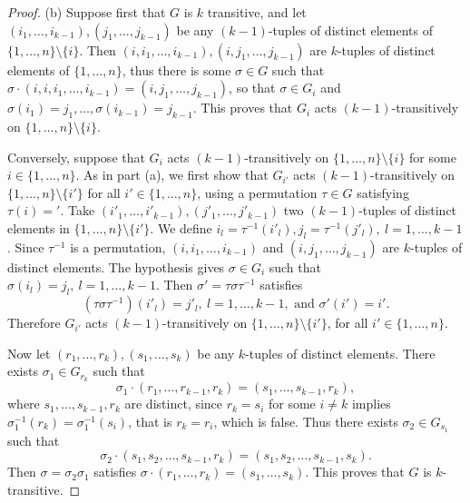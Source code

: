 \documentclass[11pt,a4paper]{article}
\begin{document}
\begin{proof}
\item[(b)] Suppose first that $G$ is $k$ transitive, and let $(i_1,\ldots,i_{k-1}), (j_1,\ldots,j_{k-1})$ be any ${(k-1)}$-tuples of distinct elements of $\{1,\ldots,n\}\setminus \{i\}$. Then $(i, i_1,\ldots,i_{k-1}), (i, j_1,\ldots,j_{k-1})$ are $k$-tuples of distinct elements of $\{1,\ldots,n\}$, thus there is some $\sigma \in G$ such that $\sigma\cdot(i,i, i_1,\ldots,i_{k-1}) = (i, j_1,\ldots,j_{k-1})$, so that $\sigma \in G_i$ and $\sigma(i_1) = j_1,\ldots,\sigma(i_{k-1}) = j_{k-1}$. This proves that $G_i$ acts $(k-1)$-transitively on $\{1,\ldots,n\} \setminus \{i\}$.

Conversely, suppose that $G_i$ acts $(k-1)$-transitively on $\{1,\ldots,n\} \setminus \{i\}$ for some $i \in \{1,\ldots,n\}$. As in part (a), we first show that $G_{i'}$ acts $(k-1)$-transitively on $\{1,\ldots,n\} \setminus \{i'\}$ for all $i' \in \{1,\ldots,n\}$, using a permutation $\tau \in G$ satisfying $\tau(i) = '$. Take $(i'_1,\ldots,i'_{k-1}), (j'_1,\ldots,j'_{k-1})$ two $(k-1)$-tuples of distinct elements in $\{1,\ldots,n\} \setminus \{i'\}$. We define $i_l= \tau^{-1}(i'_l), j_l = \tau^{-1}(j'_l),\ l=1,\ldots,k-1$. Since $\tau^{-1}$ is a permutation, $(i,i_1,\ldots,i_{k-1})$ and $(i,j_1,\ldots,j_{k-1})$ are $k$-tuples of distinct elements. The hypothesis gives $\sigma \in G_i$ such that $\sigma(i_l) = j_l,\ l=1,\ldots,k-1$. Then $\sigma'= \tau \sigma \tau^{-1}$ satisfies
$$(\tau \sigma \tau^{-1})(i'_l) = j'_l,\ l=1,\ldots,k-1,\text { and } \sigma'(i') = i'.$$
Therefore $G_{i'}$ acts $(k-1)$-transitively on $\{1,\ldots,n\} \setminus \{i'\}$, for all $i' \in \{1,\ldots,n\}$.

Now let $(r_1,\ldots,r_k), (s_1,\ldots,s_k)$ be any $k$-tuples of distinct elements. There exists $\sigma_1 \in G_{r_k}$ such that
$$\sigma_1\cdot (r_1,\ldots,r_{k-1},r_k) = (s_1,\ldots,s_{k-1},r_k),$$
where $s_1,\ldots,s_{k-1},r_k$ are distinct, since $r_k =s_i$ for some $i\ne k$ implies $\sigma_1^{-1}(r_k) = \sigma_1^{-1}(s_i)$, that is $r_k = r_i$, which is false. Thus there exists $\sigma_2  \in G_{s_1}$ such that
$$\sigma_2\cdot (s_1,s_2,\ldots,s_{k-1}, r_k) = (s_1,s_2,\ldots,s_{k-1},s_k).$$
Then $\sigma = \sigma_2\sigma_1$ satisfies $\sigma \cdot (r_1,\ldots,r_k) = (s_1,\ldots,s_k)$. This proves that $G$ is $k$-transitive.
 \end{proof}
\end{document}
